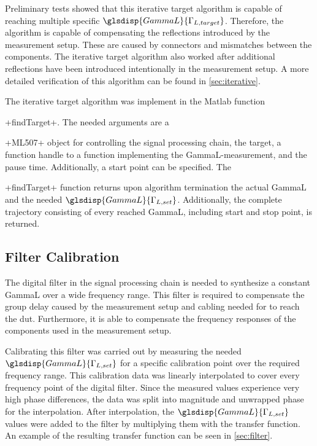 \documentclass[12pt,a4paper,parskip=full,abstract=true,BCOR=12mm]{scrreprt}
\newcommand*{\SavedLstInline}{}
\DeclareRobustCommand*{\lstinline}{%
  \ifmmode
    \let\SavedBGroup\bgroup
    \def\bgroup{%
      \let\bgroup\SavedBGroup
      \hbox\bgroup
    }%
  \fi
  \SavedLstInline
}
\begin{document}
Preliminary tests showed that this iterative target algorithm is capable
of reaching multiple specific $\glsdisp{GammaL}{\Gamma_{L,target}}$. Therefore,
the algorithm is capable of compensating the reflections introduced by
the measurement setup. These are caused by connectors and mismatches between
the components. The iterative target algorithm also
worked after additional reflections have been introduced intentionally in the
measurement setup. A more detailed verification of this algorithm can be found
in \cref{sec:iterative}.

The iterative target algorithm was implement in the Matlab function \lstinline+findTarget+.
The needed
arguments are a \lstinline+ML507+ object for controlling the signal processing
chain, the target, a function handle to a function implementing the
\gls{GammaL}-measurement, and the pause time. Additionally, a start point
can be specified. The \lstinline+findTarget+ function returns upon algorithm termination the actual
\gls{GammaL} and the needed $\glsdisp{GammaL}{\Gamma_{L,set}}$. Additionally, the complete
trajectory consisting of every reached \gls{GammaL}, including start and stop point,
is returned.


\subsection{Filter Calibration}
\label{sec:filtercal}

The digital filter in the signal processing chain is needed to
synthesize a constant \gls{GammaL} over a wide frequency range. This
filter is required to compensate the group delay caused by the measurement
setup and cabling needed for to reach the \gls{dut}. Furthermore,
it is able to compensate the frequency responses of the components used
in the measurement setup.

Calibrating this filter was carried out by measuring the needed
$\glsdisp{GammaL}{\Gamma_{L,set}}$ for a specific calibration point over
the required frequency range. This calibration data was linearly interpolated to
cover every frequency point of the digital filter. Since the measured values
experience very high phase differences, the data was split into magnitude and
unwrapped phase for the interpolation. After interpolation, the
$\glsdisp{GammaL}{\Gamma_{L,set}}$ values were added to the filter by multiplying
them with the transfer function. An example of the resulting transfer function
can be seen in \cref{sec:filter}.
\end{document}
